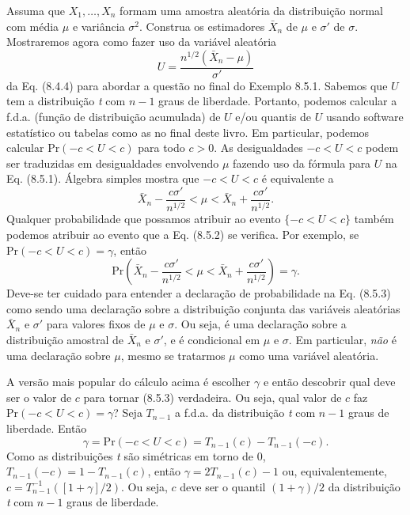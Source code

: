 Assuma que $X_1, \dots, X_n$ formam uma amostra aleatória da distribuição normal com média $\mu$ e variância $\sigma^2$. Construa os estimadores $\bar{X}_n$ de $\mu$ e $\sigma'$ de $\sigma$. Mostraremos agora como fazer uso da variável aleatória
\begin{equation} \label{eq:8.5.1}
    U = \frac{n^{1/2}(\bar{X}_n - \mu)}{\sigma'}
\end{equation}
da Eq. (8.4.4) para abordar a questão no final do Exemplo 8.5.1. Sabemos que $U$ tem a distribuição \textit{t} com $n-1$ graus de liberdade. Portanto, podemos calcular a f.d.a. (função de distribuição acumulada) de $U$ e/ou quantis de $U$ usando software estatístico ou tabelas como as no final deste livro. Em particular, podemos calcular $\text{Pr}(-c < U < c)$ para todo $c > 0$. As desigualdades $-c < U < c$ podem ser traduzidas em desigualdades envolvendo $\mu$ fazendo uso da fórmula para $U$ na Eq. (8.5.1). Álgebra simples mostra que $-c < U < c$ é equivalente a
\begin{equation} \label{eq:8.5.2}
    \bar{X}_n - \frac{c\sigma'}{n^{1/2}} < \mu < \bar{X}_n + \frac{c\sigma'}{n^{1/2}}.
\end{equation}
Qualquer probabilidade que possamos atribuir ao evento $\{-c < U < c\}$ também podemos atribuir ao evento que a Eq. (8.5.2) se verifica. Por exemplo, se $\text{Pr}(-c < U < c) = \gamma$, então
\begin{equation} \label{eq:8.5.3}
    \text{Pr}\left(\bar{X}_n - \frac{c\sigma'}{n^{1/2}} < \mu < \bar{X}_n + \frac{c\sigma'}{n^{1/2}}\right) = \gamma.
\end{equation}
Deve-se ter cuidado para entender a declaração de probabilidade na Eq. (8.5.3) como sendo uma declaração sobre a distribuição conjunta das variáveis aleatórias $\bar{X}_n$ e $\sigma'$ para valores fixos de $\mu$ e $\sigma$. Ou seja, é uma declaração sobre a distribuição amostral de $\bar{X}_n$ e $\sigma'$, e é condicional em $\mu$ e $\sigma$. Em particular, \textit{não} é uma declaração sobre $\mu$, mesmo se tratarmos $\mu$ como uma variável aleatória.

A versão mais popular do cálculo acima é escolher $\gamma$ e então descobrir qual deve ser o valor de $c$ para tornar (8.5.3) verdadeira. Ou seja, qual valor de $c$ faz $\text{Pr}(-c < U < c) = \gamma$? Seja $T_{n-1}$ a f.d.a. da distribuição \textit{t} com $n-1$ graus de liberdade. Então
$$
\gamma = \text{Pr}(-c < U < c) = T_{n-1}(c) - T_{n-1}(-c).
$$
Como as distribuições \textit{t} são simétricas em torno de 0, $T_{n-1}(-c) = 1 - T_{n-1}(c)$, então $\gamma = 2T_{n-1}(c) - 1$ ou, equivalentemente, $c = T_{n-1}^{-1}([1+\gamma]/2)$. Ou seja, $c$ deve ser o quantil $(1+\gamma)/2$ da distribuição \textit{t} com $n-1$ graus de liberdade.

